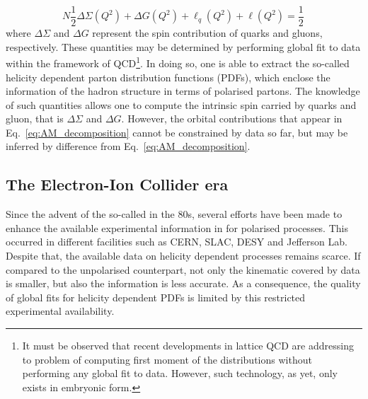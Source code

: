 %
\begin{equation}N
  \frac{1}{2} \Delta \Sigma(Q^2) + \Delta G(Q^2) + \ell_{q}(Q^2) + \ell(Q^2) = \frac{1}{2} \,
  \label{eq:AM_decomposition}
\end{equation}
%
where $\Delta \Sigma$ and $\Delta G$ represent the spin contribution of quarks and gluons, respectively. These quantities may be determined by performing global fit to data within the framework of QCD\footnote{\footnotesize It must be observed that recent developments in lattice QCD are addressing to problem of computing first moment of the distributions without performing any global fit to data. However, such technology, as yet, only exists in embryonic form.}. In doing so, one is able to extract the so-called helicity dependent parton distribution functions (PDFs), which enclose the information of the hadron structure in terms of polarised partons. The knowledge of such quantities allows one to compute the intrinsic spin carried by quarks and gluon, that is $\Delta \Sigma$ and $\Delta G$. However, the orbital contributions that appear in Eq.~\eqref{eq:AM_decomposition} cannot be constrained by data so far, but may be inferred by difference from Eq.~\eqref{eq:AM_decomposition}.

\subsection*{The Electron-Ion Collider era}

Since the advent of the so-called  in the 80s, several efforts have been made to enhance the available experimental information in for polarised processes. This occurred in different facilities such as CERN, SLAC, DESY and Jefferson Lab. Despite that, the available data on helicity dependent processes remains scarce. If compared to the unpolarised counterpart, not only the kinematic covered by data is smaller, but also the information is less accurate. As a consequence, the quality of global fits for helicity dependent PDFs is limited by this restricted experimental availability. 

